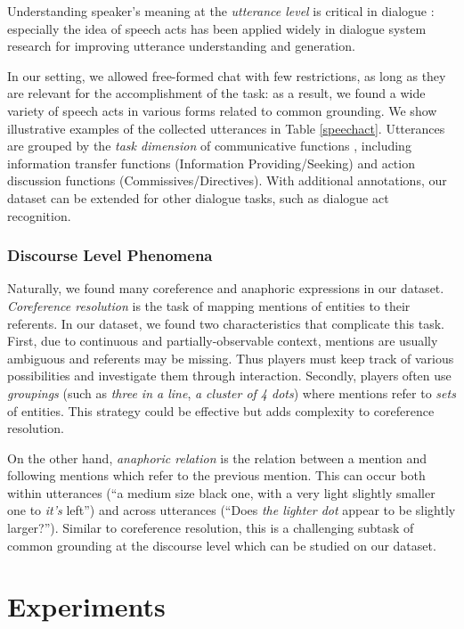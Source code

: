 \documentclass[letterpaper]{article}
\newcommand{\utterance}[1]{``#1''}
\begin{document}
Understanding speaker's meaning at the \emph{utterance level} is critical in dialogue \cite{grice1957meaning}: especially the idea of speech acts \cite{austin1975things,searle1969speech} has been applied widely in dialogue system research for improving utterance understanding and generation.

In our setting, we allowed free-formed chat with few restrictions, as long as they are relevant for the accomplishment of the task: as a result, we found a wide variety of speech acts in various forms related to common grounding. We show illustrative examples of the collected utterances in Table \ref{speechact}. Utterances are grouped by the \emph{task dimension} of communicative functions \cite{bunt2017dialogue}, including information transfer functions (Information Providing/Seeking) and action discussion functions (Commissives/Directives). With additional annotations, our dataset can be extended for other dialogue tasks, such as dialogue act recognition.

\subsubsection{Discourse Level Phenomena}

Naturally, we found many coreference and anaphoric expressions in our dataset. \emph{Coreference resolution} is the task of mapping mentions of entities to their referents. In our dataset, we found two characteristics that complicate this task. First, due to continuous and partially-observable context, mentions are usually ambiguous and referents may be missing. Thus players must keep track of various possibilities and investigate them through interaction. Secondly, players often use \emph{groupings} (such as \textit{three in a line}, \textit{a cluster of 4 dots}) where mentions refer to \emph{sets} of entities. This strategy could be effective but adds complexity to coreference resolution.

On the other hand, \emph{anaphoric relation} is the relation between a mention and following mentions which refer to the previous mention. This can occur both within utterances (\utterance{a medium size black one, with a very light slightly smaller one to \textit{it's} left}) and across utterances (\utterance{Does \textit{the lighter dot} appear to be slightly larger?}). Similar to coreference resolution, this is a challenging subtask of common grounding at the discourse level which can be studied on our dataset.

\section{Experiments}
\label{section:experiments}
\end{document}
